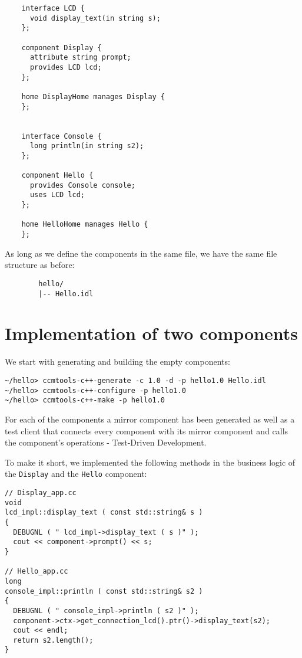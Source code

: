 \begin{verbatim}
    interface LCD {
      void display_text(in string s);
    };

    component Display {
      attribute string prompt;
      provides LCD lcd;
    };

    home DisplayHome manages Display {
    };


    interface Console {
      long println(in string s2);
    };

    component Hello {
      provides Console console;
      uses LCD lcd;
    };

    home HelloHome manages Hello {
    };
\end{verbatim}

\noindent
As long as we define the components in the same file, we have the same file structure
as before:  
\begin{verbatim}
        hello/
        |-- Hello.idl
\end{verbatim}



\section{Implementation of two components}

We start with generating and building the empty components:
\begin{verbatim}
~/hello> ccmtools-c++-generate -c 1.0 -d -p hello1.0 Hello.idl
~/hello> ccmtools-c++-configure -p hello1.0
~/hello> ccmtools-c++-make -p hello1.0
\end{verbatim}

\noindent
For each of the components a mirror component has been generated as well as a
test client that connects every component with its mirror component and calls 
the component's operations - Test-Driven Development.

To make it short, we implemented the following methods in the business logic
of the {\tt Display} and the {\tt Hello} component:
\begin{verbatim}
// Display_app.cc
void
lcd_impl::display_text ( const std::string& s )
{
  DEBUGNL ( " lcd_impl->display_text ( s )" );
  cout << component->prompt() << s;
}

// Hello_app.cc
long
console_impl::println ( const std::string& s2 )
{
  DEBUGNL ( " console_impl->println ( s2 )" );
  component->ctx->get_connection_lcd().ptr()->display_text(s2);
  cout << endl;
  return s2.length();	
}
\end{verbatim}

